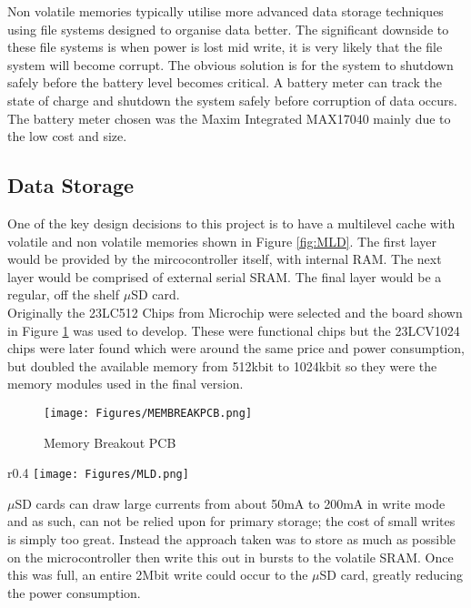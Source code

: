 \documentclass[12pt,openany,a4paper]{book}
\begin{document}
			Non volatile memories typically utilise more advanced data storage techniques using file systems designed to organise data better. The significant downside to these file systems is when power is lost mid write, it is very likely that the file system will become corrupt. The obvious solution is for the system to shutdown safely before the battery level becomes critical. A battery meter can track the state of charge and shutdown the system safely before corruption of data occurs. \\
			
			The battery meter chosen was the Maxim Integrated MAX17040 \cite{max17} mainly due to the low cost and size. %
			
		\newpage
		\subsection{Data Storage}
		One of the key design decisions to this project is to have a multilevel cache with volatile and non volatile memories shown in Figure \ref{fig:MLD}. The first layer would be provided by the mircocontroller itself, with internal RAM. The next layer would be comprised of external serial SRAM. The final layer would be a regular, off the shelf $\mu$SD card. \\
		
		Originally the 23LC512 Chips from Microchip were selected and the board shown in Figure \ref{fig:MEMBREAKPCB} was used to develop. These were functional chips but the 23LCV1024 chips were later found which were around the same price and power consumption, but doubled the available memory from 512kbit to 1024kbit so they were the memory modules used in the final version. \\
		
		\begin{figure}[H]
			\centering
			\texttt{[image: Figures/MEMBREAKPCB.png]}
			\caption{Memory Breakout PCB}
			\label{fig:MEMBREAKPCB}
		\end{figure}	
		
				
				\begin{wrapfigure}{r}{0.4\textwidth}
					\centering
					\texttt{[image: Figures/MLD.png]}
					\caption{Memory Architecture}
					\label{fig:MLD}
				\end{wrapfigure}
		
		$\mu$SD cards can draw large currents from about 50mA to 200mA in write mode \cite{Sandisk} and as such, can not be relied upon for primary storage; the cost of small writes is simply too great. Instead the approach taken was to store as much as possible on the microcontroller then write this out in bursts to the volatile SRAM. Once this was full, an entire 2Mbit write could occur to the $\mu$SD card, greatly reducing the power consumption. \\
		
\end{document}
